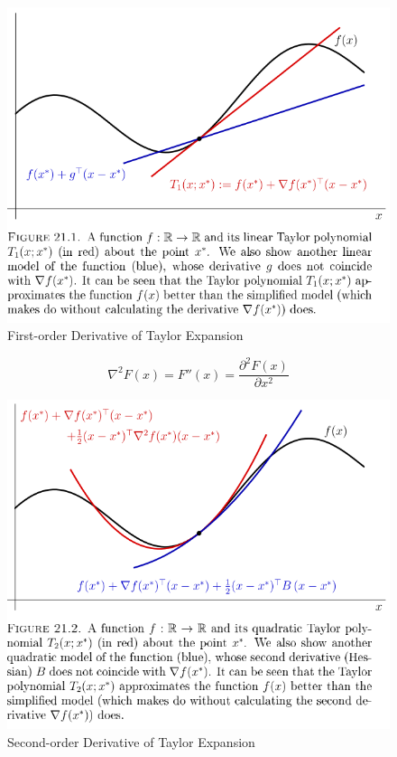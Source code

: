 \documentclass[a4paper]{report}
\numberwithin{figure}{section}
\begin{document}
\begin{figure}[H]
	\centering
	\includegraphics[width=\linewidth,natwidth=640,natheight=640]
	{fig/ref_imgs/taylor_1st_derivative.png}
	\caption{First-order Derivative of Taylor Expansion}
  \label{fig:taylor_1st_derivative}
\end{figure}



\begin{equation}
  \nabla^2 F(x) = F''(x) = \frac{\partial^2 F(x)}{\partial x^2}
\end{equation}

\begin{figure}[H]
	\centering
	\includegraphics[width=\linewidth,natwidth=640,natheight=640]
	{fig/ref_imgs/taylor_2nd_derivative.png}
	\caption{Second-order Derivative of Taylor Expansion}
  \label{fig:taylor_2nd_derivative}
\end{figure}
\end{document}
